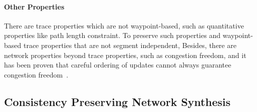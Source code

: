
\paragraph{Other Properties}

There are trace properties which are not waypoint-based, such as
quantitative properties like path length constraint. 
To preserve such properties and waypoint-based trace properties that are not segment independent,
Besides, there are network properties beyond trace properties, such as congestion freedom,
and it has been proven that careful ordering of updates cannot always guarantee congestion freedom~\cite{Hong13, loopfree-flow}. 



%

%

\subsection{Consistency Preserving Network Synthesis}
\label{sec:synthesis}

